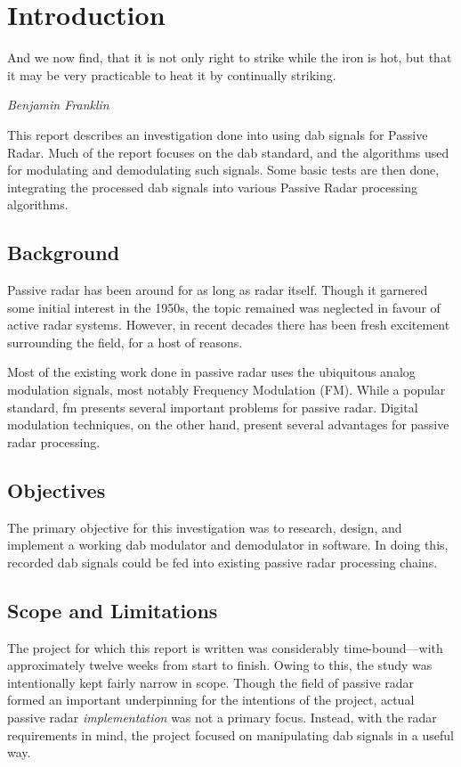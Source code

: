 \documentclass[class=report,11pt,crop=false]{standalone}
\begin{document}
\chapter{Introduction}
\epigraph{And we now find, that it is not only right to strike while the iron is hot, but that it may be very practicable to heat it by continually striking.}%
    {\emph{Benjamin Franklin}}

This report describes an investigation done into using \acrfull{dab} signals for Passive Radar. Much of the report focuses on the \acrshort{dab} standard, and the algorithms used for modulating and demodulating such signals. Some basic tests are then done, integrating the processed \acrshort{dab} signals into various Passive Radar processing algorithms.

\section{Background}
Passive radar has been around for as long as radar itself. Though it garnered some initial interest in the 1950s, the topic remained was neglected in favour of active radar systems. However, in recent decades there has been fresh excitement surrounding the field, for a host of reasons.

Most of the existing work done in passive radar uses the ubiquitous analog modulation signals, most notably Frequency Modulation (FM). While a popular standard, \acrfull{fm} presents several important problems for passive radar. Digital modulation techniques, on the other hand, present several advantages for passive radar processing.

\section{Objectives}
The primary objective for this investigation was to research, design, and implement a working \acrshort{dab} modulator and demodulator in software. In doing this, recorded \acrshort{dab} signals could be fed into existing passive radar processing chains. 

\section{Scope and Limitations}
The project for which this report is written was considerably time-bound---with approximately twelve weeks from start to finish. Owing to this, the study was intentionally kept fairly narrow in scope. Though the field of passive radar formed an important underpinning for the intentions of the project, actual passive radar \emph{implementation} was not a primary focus. Instead, with the radar requirements in mind, the project focused on manipulating \acrshort{dab} signals in a useful way.
\end{document}
